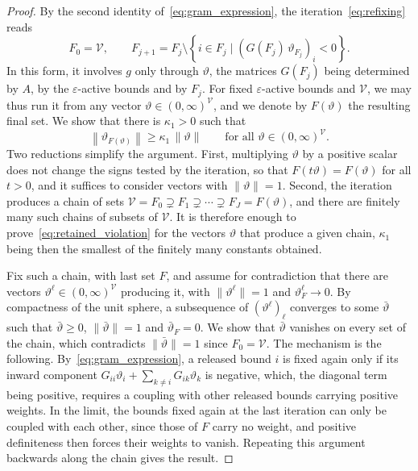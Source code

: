 \documentclass{article}
\numberwithin{equation}{section}
\newcommand{\rev}[1]{#1}
\theoremstyle{plain}
\begin{document}
\begin{proof}
	By the second identity of~\eqref{eq:gram_expression}, the iteration~\eqref{eq:refixing} reads
	\[F_0 = \mathcal{V}, \qquad F_{j+1} = F_j \setminus \left\{i \in F_j \mid \left(G(F_j)\,\vartheta_{F_j}\right)_i < 0\right\}.\]
	In this form, it involves $g$ only through $\vartheta$, the matrices $G(F_j)$ being determined by $A$, by the $\varepsilon$-active bounds and by $F_j$. For fixed $\varepsilon$-active bounds and $\mathcal{V}$, we may thus run it from any vector $\vartheta \in (0,\infty)^{\mathcal{V}}$, and we denote by $F(\vartheta)$ the resulting final set. We show that there is $\kappa_1 > 0$ such that
	\begin{equation}\label{eq:retained_violation}
		\left\|\vartheta_{F(\vartheta)}\right\| \ge \kappa_1\,\|\vartheta\| \qquad \text{for all } \vartheta \in (0,\infty)^{\mathcal{V}}.
	\end{equation}
	Two reductions simplify the argument. First, multiplying $\vartheta$ by a positive scalar does not change the signs tested by the iteration, so that $F(t\vartheta) = F(\vartheta)$ for all $t > 0$, and it suffices to consider vectors with $\|\vartheta\| = 1$. Second, the iteration produces a chain of sets $\mathcal{V} = F_0 \supsetneq F_1 \supsetneq \cdots \supsetneq F_J = F(\vartheta)$, and there are finitely many such chains of subsets of $\mathcal{V}$. It is therefore enough to prove~\eqref{eq:retained_violation} for the vectors $\vartheta$ that produce a given chain, $\kappa_1$ being then the smallest of the finitely many constants obtained.

	Fix such a chain, with last set $F$, and assume for contradiction that there are vectors $\vartheta^\ell \in (0,\infty)^{\mathcal{V}}$ producing it, with $\|\vartheta^\ell\| = 1$ and $\vartheta^\ell_F \to 0$. By compactness of the unit sphere, a subsequence of $(\vartheta^\ell)_\ell$ converges to some $\bar\vartheta$ such that $\bar\vartheta \ge 0$, $\|\bar\vartheta\| = 1$ and $\bar\vartheta_F = 0$. We show that $\bar\vartheta$ vanishes on every set of the chain, which contradicts $\|\bar\vartheta\| = 1$ since $F_0 = \mathcal{V}$. The mechanism is the following. By~\eqref{eq:gram_expression}, a released bound $i$ is fixed again only if its inward component $G_{ii}\vartheta_i + \sum_{k\ne i}G_{ik}\vartheta_k$ is \rev{negative, which,} the diagonal term being positive, requires a coupling with other released bounds carrying positive weights. In the limit, the bounds fixed again at the last iteration can only be coupled with each other, since those of $F$ carry no weight, and positive definiteness then forces their weights to vanish. Repeating this argument backwards along the chain gives the result.


\end{proof}
\end{document}
